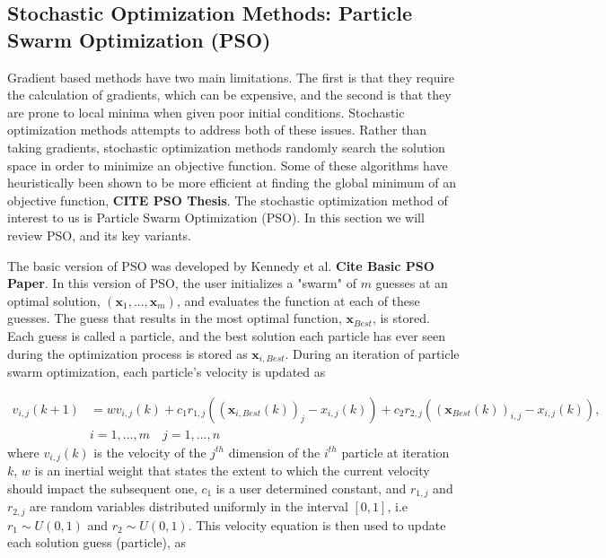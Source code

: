 \subsection{Stochastic Optimization Methods: Particle Swarm Optimization (PSO)}
Gradient based methods have two main limitations. The first is that they require the calculation of gradients, which can be expensive, and the second is that they are prone to local minima when given poor initial conditions. Stochastic optimization methods attempts to address both of these issues. Rather than taking gradients, stochastic optimization methods randomly search the solution space in order to minimize an objective function. Some of these algorithms have heuristically been shown to be more efficient at finding the global minimum of an objective function, \textbf{CITE PSO Thesis}. The stochastic optimization method of interest to us is Particle Swarm Optimization (PSO). In this section we will review PSO, and its key variants.  

The basic version of PSO was developed by Kennedy et al. \textbf{Cite Basic PSO Paper}. In this version of PSO, the user initializes a "swarm" of $m$ guesses at an optimal solution, $(\mathbf{x}_1,...,\mathbf{x}_m)$, and evaluates the function at each of these guesses. The guess that results in the most optimal function, $\mathbf{x}_{Best}$, is stored. Each guess is called a particle, and the best solution each particle has ever seen during the optimization process is stored as $\mathbf{x}_{i,Best}$. During an iteration of particle swarm optimization, each particle's velocity is updated as 

\begin{equation} \label{pso_vel}
    \begin{aligned}
    v_{i,j}(k+1) &= w v_{i,j}(k) + c_1 r_{1,j}((\mathbf{x}_{i,Best}(k))_j - x_{i,j}(k)) + c_2 r_{2,j} ((\mathbf{x}_{Best}(k))_{i,j} - x_{i,j}(k)), \\ 
    &i=1,...,m \quad j=1,...,n
    \end{aligned}
\end{equation}
where $v_{i,j}(k)$ is the velocity of the $j^{th}$ dimension of the $i^{th}$ particle at iteration $k$, $w$ is an inertial weight that states the extent to which the current velocity should impact the subsequent one, $c_1$ is a user determined constant, and $r_{1,j}$ and $r_{2,j}$ are random variables distributed uniformly in the interval $[0,1]$, i.e $r_1 \sim U(0,1)$ and $r_2 \sim U(0,1)$. This velocity equation is then used to update each solution guess (particle), as

